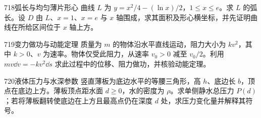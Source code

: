 \begin{exercise}{718}{弧长与均匀薄片形心}
曲线 $L$ 为 $y=x^2/4-(\ln x)/2$，$1\le x\le e$。求 $L$ 的弧长。设 $D$ 由 $L$、$x=1$、$x=e$ 与 $x$ 轴围成，求其面积及形心横坐标，并先证明曲线在所给区间位于 $x$ 轴上方。
\end{exercise}
\begin{exercise}{719}{变力做功与动能定理}
质量为 $m$ 的物体沿水平直线运动，阻力大小为 $kv^2$，其中 $k>0$、$v$ 为速率。物体仅受此阻力，从速率 $v_0>0$ 减至 $v_0/2$。利用 $mv\dd v=-kv^2\dd s$ 求此过程中的位移、阻力做功，并核验动能定理。
\end{exercise}
\begin{exercise}{720}{液体压力与水深参数}
竖直薄板为底边水平的等腰三角形，高 $h$、底边长 $b$，顶点在底边上方。薄板顶点距水面 $d\ge0$，水的密度为 $\rho$。求单侧静水总压力 $P(d)$；若将薄板翻转使底边在上方且最高点仍在深度 $d$ 处，求压力变化量并解释其符号。
\end{exercise}
